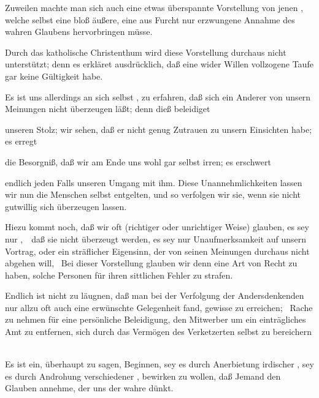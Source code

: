 \begin{aufza}
\begin{aufzb}
\begin{RWanm}
\end{RWanm}
\item Zuweilen machte man sich auch eine etwas überspannte Vorstellung von jenen , welche selbst eine bloß äußere, eine aus Furcht nur erzwungene Annahme des wahren Glaubens hervorbringen müsse.
\begin{RWanm}
Durch das katholische Christenthum wird diese Vorstellung durchaus nicht unterstützt; denn es erkläret ausdrücklich, daß eine wider Willen vollzogene Taufe gar keine Gültigkeit habe.
\end{RWanm}
\item Es ist uns allerdings an sich selbst , zu erfahren, daß sich ein Anderer von unsern Meinungen nicht überzeugen läßt; denn dieß beleidiget
\begin{aufzc}
\item unseren Stolz; wir sehen, daß er nicht genug Zutrauen zu unsern Einsichten habe; es erregt
\item die Besorgniß, daß wir am Ende uns wohl gar selbst irren; es erschwert
\item endlich jeden Falls unseren Umgang mit ihm. Diese Unannehmlichkeiten lassen wir nun die Menschen selbst entgelten, und so verfolgen wir sie, wenn sie nicht gutwillig sich überzeugen lassen.
\end{aufzc}
\item Hiezu kommt noch, daß wir oft (richtiger oder unrichtiger Weise) glauben, es sey nur ,~\ daß sie nicht überzeugt werden, es sey nur Unaufmerksamkeit auf unsern Vortrag, oder ein sträflicher Eigensinn, der von seinen Meinungen durchaus nicht abgehen will, \udgl\ Bei dieser Vorstellung glauben wir denn eine Art von Recht zu haben, solche Personen für ihren sittlichen Fehler zu strafen.
\item Endlich ist nicht zu läugnen, daß man bei der Verfolgung der Andersdenkenden nur allzu oft auch eine erwünschte Gelegenheit fand, gewisse  zu erreichen; \zB\ Rache zu nehmen für eine persönliche Beleidigung, den Mitwerber um ein einträgliches Amt zu entfernen, sich durch das Vermögen des Verketzerten selbst zu bereichern \usw\
\end{aufzb}
\item Es ist ein, überhaupt zu sagen,  Beginnen, sey es durch Anerbietung irdischer , sey es durch Androhung verschiedener , bewirken zu wollen, daß Jemand den Glauben annehme, der uns der wahre dünkt.

\end{aufza}
